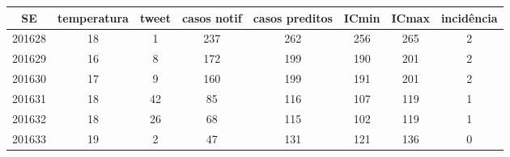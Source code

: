 \begin{tabular}{c|ccccccc}
  \hline
SE & temperatura & tweet & casos notif & casos preditos & ICmin & ICmax & incidência \\ 
  \hline
201628 & 18 & 1 & 237 & 262 & 256 & 265 & 2 \\ 
  201629 & 16 & 8 & 172 & 199 & 190 & 201 & 2 \\ 
  201630 & 17 & 9 & 160 & 199 & 191 & 201 & 2 \\ 
  201631 & 18 & 42 & 85 & 116 & 107 & 119 & 1 \\ 
  201632 & 18 & 26 & 68 & 115 & 102 & 119 & 1 \\ 
  201633 & 19 & 2 & 47 & 131 & 121 & 136 & 0 \\ 
   \hline
\end{tabular}
